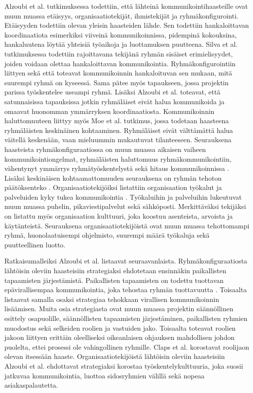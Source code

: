 Alzoubi et al. tutkimuksessa \cite{ALZOUBI201622} todettiin, että lähteinä kommunikointihaasteille ovat muun muassa etäisyys, organisaatiotekijät, ihmistekijät ja ryhmäkonfigurointi. Etäisyyden todettiin olevan yleisin haasteiden lähde. Sen todettiin hankaloittavan koordinaatiota esimerkiksi viiveinä kommunikoinnissa, pidempinä kokouksina, hankaluutena löytää yhteisiä työaikoja ja luottamuksen puutteena. Silva et al. tutkimuksessa \cite{SELLERISILVA201520} todettiin rajoittavana tekijänä ryhmän sisäiset erimielisyydet, joiden voidaan olettaa hankaloittavan kommunikointia. Ryhmäkonfigurointiin liittyen sekä \cite{SELLERISILVA201520} että \cite{ALZOUBI201622} toteavat kommunikoinnin hankaloituvan sen mukaan, mitä suurempi ryhmä on kyseessä. Sama pätee myös tapaukseen, jossa projektin parissa työskentelee useampi ryhmä. Lisäksi Alzoubi et al. \cite{ALZOUBI201622} toteavat, että satunnaisissa tapauksissa jotkin ryhmäläiset eivät halua kommunikoida ja omaavat huonomman ymmärryksen koordinaatiosta. Kommunikoinnin haluttomuuteen liittyy myös Moe et al. \cite{MOE2012853} tutkimus, jossa todetaan haasteena ryhmäläisten keskinäinen kohtaaminen. Ryhmäläiset eivät välttämättä halua väitellä keskenään, vaan mieluummin mukautuvat tilanteeseen. Seurauksena haasteista ryhmäkonfiguraatiossa on muun muassa aikaisen vaiheen kommunikointiongelmat, ryhmäläisten haluttomuus ryhmäkommunikointiin, vähentynyt ymmärrys ryhmätyöskentelystä sekä hitaus kommunikoinnissa \cite{ALZOUBI201622}. Lisäksi keskinäisen kohtaamattomuuden seurauksena on ryhmän tehoton päätöksenteko \cite{MOE2012853}. Organisaatiotekijöiksi listattiin organisaation työkalut ja palveluiden kyky tukea kommunikointia \cite{ALZOUBI201622}. Työkaluihin ja palveluihin lukeutuvat muun muassa puhelin, pikaviestipalvelut sekä sähköposti. Merkittäväksi tekijäksi on listattu myös organisaation kulttuuri, joka koostuu asenteista, arvoista ja käytänteistä. Seurauksena organisaatiotekijöistä ovat muun muassa tehottomampi ryhmä, huonolaatuisempi ohjelmisto, suurempi määrä työkaluja sekä puutteellinen luotto.

Ratkaisumalleiksi Alzoubi et al. \cite{ALZOUBI201622} listaavat seuraavanlaista. Ryhmäkonfiguraatiosta lähtöisin oleviin haasteisiin strategiaksi ehdotetaan ensinnäkin paikallisten tapaamisten järjestämistä. Paikallisten tapaamisten on todettu tuottavan epävirallisempaa kommunikointia, joka tehostaa ryhmän tuottavuutta \cite{DEOMELO2013412}. Toisaalta \cite{ALZOUBI201622} listaavat samalla osaksi strategiaa tehokkaan virallisen kommunikoinnin lisäämisen. Muita osia strategiasta ovat muun muassa projektin säännöllinen esittely osapuolille, säännöllisten tapaamisten järjestäminen, paikallisten ryhmien muodostus sekä selkeiden roolien ja vastuiden jako. Toisaalta \cite{CLAPS201521} toteavat roolien jakoon liittyen erittäin oleelliseksi oikeanlaisen ohjauksen mahdollisen johdon puolelta, ettei prosessi ole vahingollinen ryhmille. Claps et al. \cite{CLAPS201521} korostavat roolijaon olevan itsessään haaste. Organisaatiotekijöistä lähtöisin oleviin haasteisiin Alzoubi et al. \cite{ALZOUBI201622} ehdottavat strategiaksi korostaa työskentelykulttuuria, joka suosii jatkuvaa kommunikointia, luottoa sidosryhmien välillä sekä nopeaa asiakaspalautetta. 


